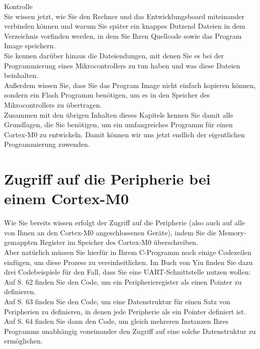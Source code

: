 Kontrolle\\

Sie wissen jetzt, wie Sie den Rechner und das Entwicklungsboard miteinander verbinden können und warum Sie später ein knappes Dutzend Dateien in dem Verzeichnis vorfinden werden, in dem Sie Ihren Quellcode sowie das Program Image speichern.\\

Sie kennen darüber hinaus die Dateiendungen, mit denen Sie es bei der Programmierung eines Mikrocontrollers zu tun haben und was diese Dateien beinhalten.\\

Außerdem wissen Sie, dass Sie das Program Image nicht einfach kopieren können, sondern ein Flash Programm benötigen, um es in den Speicher des Mikrocontrollers zu übertragen.\\

Zusammen mit den übrigen Inhalten dieses Kapitels kennen Sie damit alle Grundlagen, die Sie benötigen, um ein umfangreiches Programm für einen Cortex-M0 zu entwickeln. Damit können wir uns jetzt endlich der eigentlichen Programmierung zuwenden.

\section{Zugriff auf die Peripherie bei einem Cortex-M0}

Wie Sie bereits wissen erfolgt der Zugriff auf die Peripherie (also auch auf alle von Ihnen an den Cortex-M0 angeschlossenen Geräte), indem Sie die Memory-gemappten Register im Speicher des Cortex-M0 überschreiben.\\

Aber natürlich müssen Sie hierfür in Ihrem C-Programm noch einige Codezeilen einfügen, um diese Prozess zu vereinheitlichen. Im Buch von Yiu finden Sie dazu drei Codebeispiele für den Fall, dass Sie eine UART-Schnittstelle nutzen wollen:\\

Auf S. 62 finden Sie den Code, um ein Peripherieregister als einen Pointer zu definieren.\\

Auf S. 63 finden Sie den Code, um eine Datenstruktur für einen Satz von Peripherien zu definieren, in denen jede Peripherie als ein Pointer definiert ist.\\

Auf S. 64 finden Sie dann den Code, um gleich mehreren Instanzen Ihres Programms unabhängig voneinander den Zugriff auf eine solche Datenstruktur zu ermöglichen.

